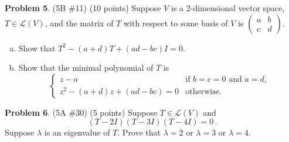 \documentclass[reqno, 12pt]{amsart}
\theoremstyle{definition}
\newenvironment{problab}[1]
{\noindent\textbf{Problem #1}.}
{\vskip 6pt}
\theoremstyle{remark}
\renewcommand{\L}{\mathcal L}
\begin{document}
\begin{problab}{5} (5B \#11) (10 points)
  Suppose $V$ is a $2$-dimensional vector space, $T \in \L(V)$, and the matrix of $T$ with respect to some basis of $V$ is
  $
  \begin{pmatrix}
    a & b\\
    c & d
  \end{pmatrix}.
  $
  \begin{enumerate}[(a)]
    \item 
      Show that $T^2 - (a+d)T + (ad-bc)I = 0$.
    \item
      Show that the minimal polynomial of $T$ is
      \begin{equation*}
        \begin{cases}
          z-a & \text{if $b=c=0$ and $a=d$,}\\
          z^2 - (a+d)z + (ad-bc) = 0 & \text{otherwise.}

        \end{cases}
      \end{equation*}
  \end{enumerate}
\end{problab}

\begin{problab}{6} (5A \#30) (5 points)
  Suppose $T \in \L(V)$ and
  \begin{equation*}
    (T-2I)(T-3I)(T-4I) = 0 \, .
  \end{equation*}
  Suppose $\lambda$ is an eigenvalue of $T$. Prove that $\lambda = 2$ or $\lambda = 3$ or $\lambda = 4$.
\end{problab}
\end{document}
